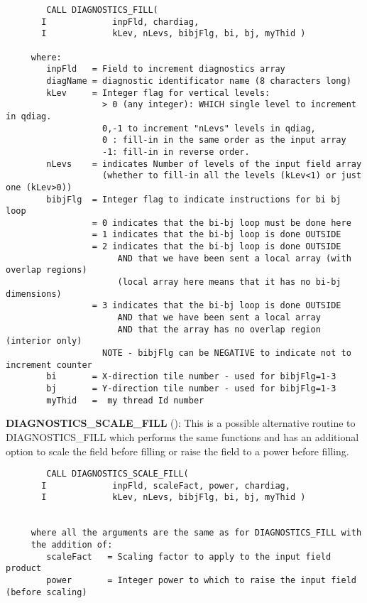 \begin{verbatim}
        CALL DIAGNOSTICS_FILL(
       I             inpFld, chardiag,
       I             kLev, nLevs, bibjFlg, bi, bj, myThid )

     where:
        inpFld   = Field to increment diagnostics array
        diagName = diagnostic identificator name (8 characters long)
        kLev     = Integer flag for vertical levels:
                   > 0 (any integer): WHICH single level to increment in qdiag.
                   0,-1 to increment "nLevs" levels in qdiag,
                   0 : fill-in in the same order as the input array
                   -1: fill-in in reverse order.
        nLevs    = indicates Number of levels of the input field array
                   (whether to fill-in all the levels (kLev<1) or just one (kLev>0))
        bibjFlg  = Integer flag to indicate instructions for bi bj loop
                 = 0 indicates that the bi-bj loop must be done here
                 = 1 indicates that the bi-bj loop is done OUTSIDE
                 = 2 indicates that the bi-bj loop is done OUTSIDE
                      AND that we have been sent a local array (with overlap regions)
                      (local array here means that it has no bi-bj dimensions)
                 = 3 indicates that the bi-bj loop is done OUTSIDE
                      AND that we have been sent a local array
                      AND that the array has no overlap region (interior only)
                   NOTE - bibjFlg can be NEGATIVE to indicate not to increment counter
        bi       = X-direction tile number - used for bibjFlg=1-3
        bj       = Y-direction tile number - used for bibjFlg=1-3
        myThid   =  my thread Id number
\end{verbatim}

\noindent
{\bf DIAGNOSTICS\_SCALE\_FILL} 
():
This is a possible alternative routine to
DIAGNOSTICS\_FILL which performs the same functions and has an additional option
to scale the field before filling or raise the field to a power before filling.

\begin{verbatim}
        CALL DIAGNOSTICS_SCALE_FILL(
       I             inpFld, scaleFact, power, chardiag,
       I             kLev, nLevs, bibjFlg, bi, bj, myThid )


     where all the arguments are the same as for DIAGNOSTICS_FILL with 
     the addition of:
        scaleFact   = Scaling factor to apply to the input field product
        power       = Integer power to which to raise the input field (before scaling)
\end{verbatim}

